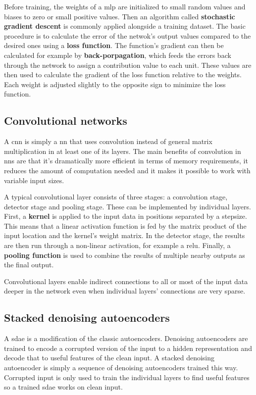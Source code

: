 Before training, the weights of a \ac{mlp} are initialized to small random values and 
biases to zero or small positive values. Then an algorithm called \textbf{stochastic
gradient descent} is commonly applied alongside a training dataset. The basic procedure
is to calculate the error of the netwok's output values compared to the desired ones 
using a \textbf{loss function}. The function's gradient can then be calculated for
example by \textbf{back-porpagation}, which feeds the errors back through the network
to assign a contribution value to each unit. These values are then used to calculate
the gradient of the loss function relative to the weights. Each weight is adjusted
slightly to the opposite sign to minimize the loss function.

\subsection{Convolutional networks}

A \ac{cnn} is simply a \ac{nn} that uses convolution instead of general matrix
multiplication in at least one of its layers. The main benefits of convolution in \ac{nn}s
are that it's dramatically more efficient in terms of memory requirements, it reduces
the amount of computation needed and it makes it possible to work with variable input
sizes.

A typical convolutional layer consists of three stages: a convolution stage, detector
stage and pooling stage. These can be implemented by individual layers. First, a
\textbf{kernel} is applied to the input data in positions separated by a stepsize. This
means that a linear activation function is fed by the matrix product of the input location
and the kernel's weight matrix. In the detector stage, the results are then run through
a non-linear activation, for example a \ac{relu}. Finally, a \textbf{pooling function}
is used to combine the results of multiple nearby outputs as the final output.

Convolutional layers enable indirect connections to all or most of the input data deeper
in the network even when individual layers' connections are very sparse.

\subsection{Stacked denoising autoencoders}
A \ac{sdae} is a modification of the classic autoencoders. Denoising autoencoders
are trained to encode a corrupted version of the input to a hidden representation
and decode that to useful features of the clean input. A stacked denoising autoencoder
is simply a sequence of denoising autoencoders trained this way. Corrupted input
is only used to train the individual layers to find useful features so a trained
\ac{sdae} works on clean input.~\cite{SDAE}
